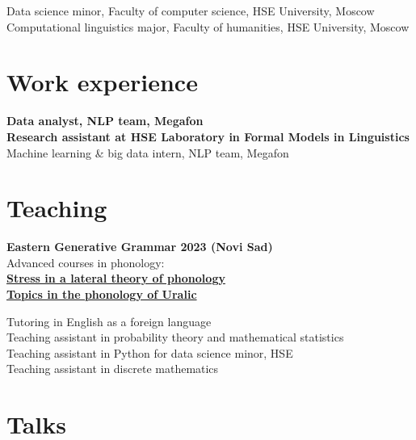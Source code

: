 \documentclass[11pt]{article} %
\begin{document}
 Data science minor, Faculty of computer science, HSE University, Moscow\\
 Computational linguistics major, Faculty of humanities, HSE University, Moscow


\section*{Work experience}

 \textbf{Data analyst, NLP team, Megafon}\\
 \textbf{Research assistant at HSE Laboratory in Formal Models in Linguistics}\\
 Machine learning \& big data intern, NLP team, Megafon\\

\section*{Teaching}

 \textbf{Eastern Generative Grammar 2023 (Novi Sad)}\\
{Advanced courses in phonology:}\\
\textbf{\href{https://www.eggschool.org/classes/shikunova-stress-in-a-lateral-theory-of-phonology/}{Stress in a lateral theory of phonology}}\\
\textbf{\href{https://www.eggschool.org/classes/shikunova-topics-in-the-phonology-of-uralic/}{Topics in the phonology of Uralic}}

\vspace*{1em}

 Tutoring in English as a foreign language\\
 Teaching assistant in probability theory and mathematical statistics\\
 Teaching assistant in Python for data science minor, HSE\\
 Teaching assistant in discrete mathematics

\section*{Talks}
\end{document}

